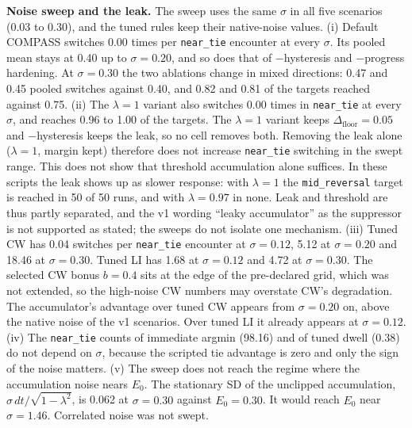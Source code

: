 \documentclass[11pt]{article}
\newcommand{\Dfloor}{\Delta_{\text{floor}}}
\newcommand{\code}[1]{\texttt{#1}}
\begin{document}
\noindent\textbf{Noise sweep and the leak.} The sweep uses the same $\sigma$ in all five scenarios (0.03 to 0.30), and the tuned rules keep their native-noise values. (i) Default COMPASS switches 0.00 times per \code{near\_tie} encounter at every $\sigma$. Its pooled mean stays at 0.40 up to $\sigma=0.20$, and so does that of $-$hysteresis and $-$progress hardening. At $\sigma=0.30$ the two ablations change in mixed directions: 0.47 and 0.45 pooled switches against 0.40, and 0.82 and 0.81 of the targets reached against 0.75. (ii) The $\lambda=1$ variant also switches 0.00 times in \code{near\_tie} at every $\sigma$, and reaches 0.96 to 1.00 of the targets. The $\lambda=1$ variant keeps $\Dfloor=0.05$ and $-$hysteresis keeps the leak, so no cell removes both. Removing the leak alone ($\lambda=1$, margin kept) therefore does not increase \code{near\_tie} switching in the swept range. This does not show that threshold accumulation alone suffices. In these scripts the leak shows up as slower response: with $\lambda=1$ the \code{mid\_reversal} target is reached in 50 of 50 runs, and with $\lambda=0.97$ in none. Leak and threshold are thus partly separated, and the v1 wording ``leaky accumulator'' as the suppressor is not supported as stated; the sweeps do not isolate one mechanism. (iii) Tuned CW has 0.04 switches per \code{near\_tie} encounter at $\sigma=0.12$, 5.12 at $\sigma=0.20$ and 18.46 at $\sigma=0.30$. Tuned LI has 1.68 at $\sigma=0.12$ and 4.72 at $\sigma=0.30$. The selected CW bonus $b=0.4$ sits at the edge of the pre-declared grid, which was not extended, so the high-noise CW numbers may overstate CW's degradation. The accumulator's advantage over tuned CW appears from $\sigma=0.20$ on, above the native noise of the v1 scenarios. Over tuned LI it already appears at $\sigma=0.12$. (iv) The \code{near\_tie} counts of immediate argmin (98.16) and of tuned dwell (0.38) do not depend on $\sigma$, because the scripted tie advantage is zero and only the sign of the noise matters. (v) The sweep does not reach the regime where the accumulation noise nears $E_0$. The stationary SD of the unclipped accumulation, $\sigma\,dt/\sqrt{1-\lambda^2}$, is 0.062 at $\sigma=0.30$ against $E_0=0.30$. It would reach $E_0$ near $\sigma=1.46$. Correlated noise was not swept.
\end{document}
